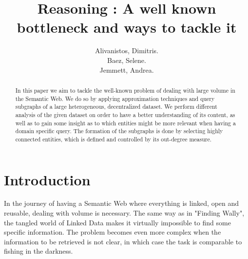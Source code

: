 \documentclass[runningheads,a4paper]{../../StyleFiles/llncs}
\begin{document}
\mainmatter  %

\title{Reasoning : A well known bottleneck and ways to tackle it}


%
%
\author{Alivanistos, Dimitris. \\ Baez, Selene. \\ Jemmett, Andrea. }
%


\maketitle


\begin{abstract}
In this paper we aim to tackle the well-known problem of dealing with large volume in the Semantic Web. We do so by applying approximation techniques and query subgraphs of a large heterogeneous, decentralized dataset. We perform different analysis of the given dataset on order to have a better understanding of its content, as well as to gain some insight as to which entities might be more relevant when having a domain specific query. The formation of the subgraphs is done by selecting highly connected entities, which is defined and controlled by its out-degree measure. 
\end{abstract}


\section{Introduction}
In the journey of having a Semantic Web where everything is linked, open and reusable, dealing with volume is necessary. The same way as in "Finding Wally", the tangled world of Linked Data makes it virtually impossible to find some specific information. The problem becomes even more complex when the information to be retrieved is not clear, in which case the task is comparable to fishing in the darkness.
\end{document}
